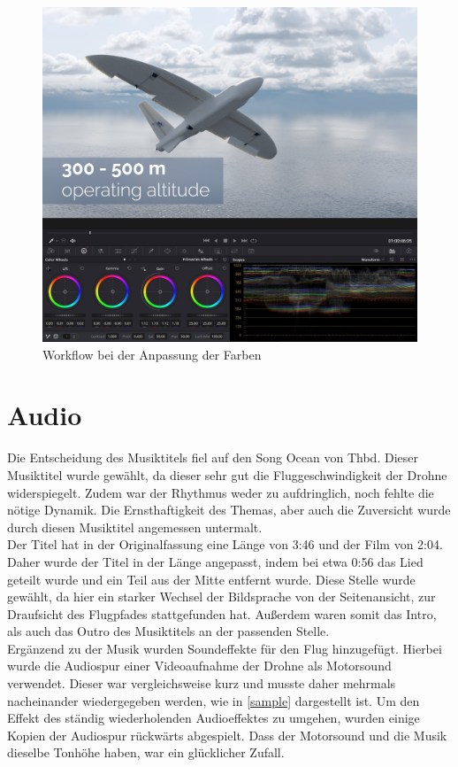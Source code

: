 \begin{figure}[H]
\begin{center}
\includegraphics[width=\textwidth]{gfx/post/resolve7.jpg}
\caption{Workflow bei der Anpassung der Farben}
\label{resolve7}
\end{center}
\end{figure}

\section{Audio}

Die Entscheidung des Musiktitels fiel auf den Song Ocean von Thbd. Dieser Musiktitel wurde gewählt, da dieser sehr gut die Fluggeschwindigkeit der Drohne widerspiegelt. Zudem war der Rhythmus weder zu aufdringlich, noch fehlte die nötige Dynamik. Die Ernsthaftigkeit des Themas, aber auch die Zuversicht wurde durch diesen Musiktitel angemessen untermalt.\\
Der Titel hat in der Originalfassung eine Länge von 3:46 und der Film von 2:04. Daher wurde der Titel in der Länge angepasst, indem bei etwa 0:56 das Lied geteilt wurde und ein Teil aus der Mitte entfernt wurde. Diese Stelle wurde gewählt, da hier ein starker Wechsel der Bildsprache von der Seitenansicht, zur Draufsicht des Flugpfades stattgefunden hat. Außerdem waren somit das Intro, als auch das Outro des Musiktitels an der passenden Stelle.\\
Ergänzend zu der Musik wurden Soundeffekte für den Flug hinzugefügt. Hierbei wurde die Audiospur einer Videoaufnahme der Drohne als Motorsound verwendet. Dieser war vergleichsweise kurz und musste daher mehrmals nacheinander wiedergegeben werden, wie in \autoref{sample} dargestellt ist. Um den Effekt des ständig wiederholenden Audioeffektes zu umgehen, wurden einige Kopien der Audiospur rückwärts abgespielt. Dass der Motorsound und die Musik dieselbe Tonhöhe haben, war ein glücklicher Zufall.\\

